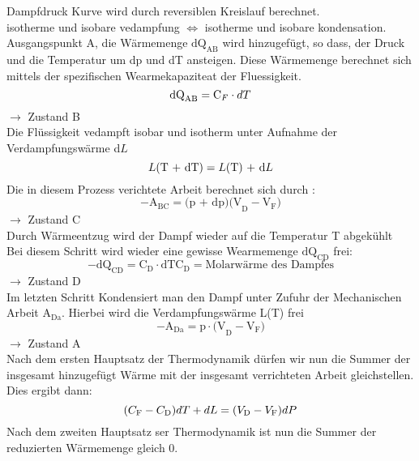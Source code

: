 Dampfdruck Kurve wird durch reversiblen Kreislauf berechnet.\\
isotherme und isobare vedampfung $\Leftrightarrow$ isotherme und isobare kondensation.\\


Ausgangspunkt A, die Wärmemenge $\text{dQ}_\text{AB} $ wird hinzugefügt, so dass, der Druck und die Temperatur um dp und dT ansteigen.
Diese Wärmemenge berechnet sich mittels der spezifischen Wearmekapaziteat der Fluessigkeit.
\begin{equation}
    \text{dQ}_\text{AB}= \text{C}_F \cdot dT \nonumber\\
\end{equation}
$\rightarrow$ Zustand B\\
Die Flüssigkeit vedampft isobar und isotherm unter Aufnahme der Verdampfungswärme d$L$\\
\begin{equation}
L\text{(T + dT)} = L\text{(T) + d}L\nonumber\\
\end{equation}
Die in diesem Prozess verichtete Arbeit berechnet sich durch :\\
\begin{equation}
   - \text{A}_\text{BC} = \text{(p + dp)(V}_\text{D} - \text{V}_\text{F}\text{)} 
\end{equation}
$\rightarrow$ Zustand C\\
Durch Wärmeentzug wird der Dampf wieder auf die Temperatur T abgekühlt \\
Bei diesem Schritt wird wieder eine gewisse Wearmemenge $\text{dQ}_\text{CD}$ frei:
\begin{equation}
 -\text{dQ}_\text{CD} = \text{C}_\text{D}\cdot \text{dT} \text{C}_\text{D} = \text{Molarwärme des Dampfes}   
\end{equation}
$\rightarrow$ Zustand D\\
Im letzten Schritt Kondensiert man den Dampf unter Zufuhr der Mechanischen Arbeit $\text{A}_\text{Da}$.
Hierbei wird die Verdampfungswärme L(T) frei\\ 
\begin{equation}
    -\text{A}_\text{Da}= \text{p}\cdot\text{(V}_\text{D} - \text{V}_\text{F}\text{)}
\end{equation}
$\rightarrow$ Zustand A\\

Nach dem ersten Hauptsatz der Thermodynamik dürfen wir nun die Summer der insgesamt hinzugefügt Wärme mit der insgesamt 
verrichteten Arbeit gleichstellen. Dies ergibt dann:        
\begin{equation}
    (C_\text{F}-C_\text{D})dT + dL = (V_\text{D}-V_\text{F})dP\\
    \label{eqn:wearme=Arbeit}
\end{equation}
Nach dem zweiten Hauptsatz ser Thermodynamik ist nun die Summer der reduzierten Wärmemenge gleich 0.

